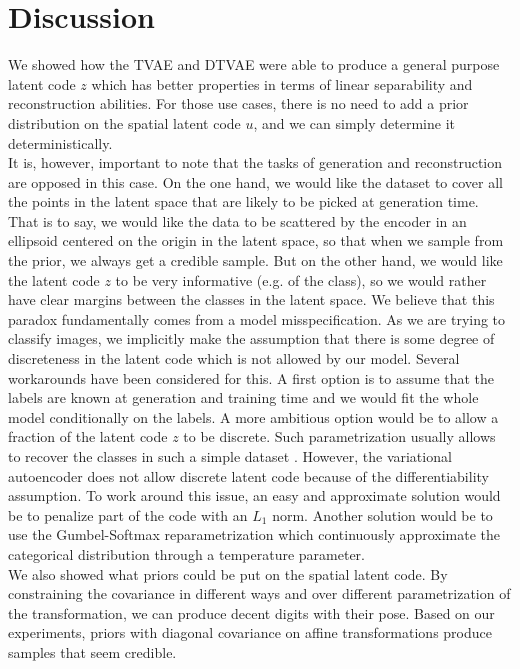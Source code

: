\documentclass[letterpaper, twoside]{article}
\begin{document}
\section{Discussion}


      We showed how the TVAE and DTVAE were able to produce a general purpose latent code $z$ which has better properties in terms of linear separability and reconstruction abilities. For those use cases, there is no need to add a prior distribution on the spatial latent code $u$, and we can simply determine it deterministically. \\

      It is, however, important to note that the tasks of generation and reconstruction are opposed in this case. On the one hand, we would like the dataset to cover all the points in the latent space that are likely to be picked at generation time. That is to say, we would like the data to be scattered by the encoder in an ellipsoid centered on the origin in the latent space, so that when we sample from the prior, we always get a credible sample. But on the other hand, we would like the latent code $z$ to be very informative (e.g. of the class), so we would rather have clear margins between the classes in the latent space. We believe that this paradox fundamentally comes from a model misspecification. As we are trying to classify images, we implicitly make the assumption that there is some degree of discreteness in the latent code which is not allowed by our model. Several workarounds have been considered for this. A first option is to assume that the labels are known at generation and training time and we would fit the whole model conditionally on the labels. A more ambitious option would be to allow a fraction of the latent code $z$ to be discrete. Such parametrization usually allows to recover the classes in such a simple dataset \cite{chen.infogan}. However, the variational autoencoder does not allow discrete latent code because of the differentiability assumption. To work around this issue, an easy and approximate solution would be to penalize part of the code with an $L_1$ norm. Another solution would be to use the Gumbel-Softmax reparametrization \cite{JangCatReparam} which continuously approximate the categorical distribution through a temperature parameter.\\

      We also showed what priors could be put on the spatial latent code. By constraining the covariance in different ways and over different parametrization of the transformation, we can produce decent digits with their pose. Based on our experiments, priors with diagonal covariance on affine transformations produce samples that seem credible. \\
\end{document}
